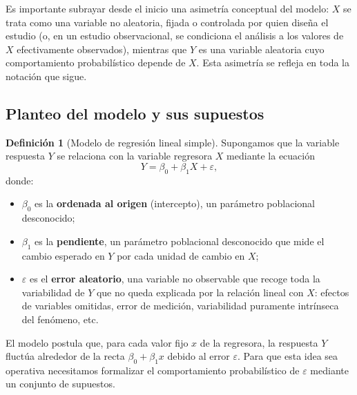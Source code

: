 \documentclass[11pt,a4paper]{article}
\theoremstyle{plain}
\theoremstyle{definition}
\newtheorem{definicion}[teorema]{Definición}
\theoremstyle{remark}
\begin{document}
Es importante subrayar desde el inicio una asimetría conceptual del modelo: $X$ se trata como una variable no aleatoria, fijada o controlada por quien diseña el estudio (o, en un estudio observacional, se condiciona el análisis a los valores de $X$ efectivamente observados), mientras que $Y$ es una variable aleatoria cuyo comportamiento probabilístico depende de $X$. Esta asimetría se refleja en toda la notación que sigue.

\subsection{Planteo del modelo y sus supuestos}

\begin{definicion}[Modelo de regresión lineal simple]
Supongamos que la variable respuesta $Y$ se relaciona con la variable regresora $X$ mediante la ecuación
\[
Y = \beta_0 + \beta_1 X + \varepsilon,
\]
donde:
\begin{itemize}
\item $\beta_0$ es la \textbf{ordenada al origen} (intercepto), un parámetro poblacional desconocido;
\item $\beta_1$ es la \textbf{pendiente}, un parámetro poblacional desconocido que mide el cambio esperado en $Y$ por cada unidad de cambio en $X$;
\item $\varepsilon$ es el \textbf{error aleatorio}, una variable no observable que recoge toda la variabilidad de $Y$ que no queda explicada por la relación lineal con $X$: efectos de variables omitidas, error de medición, variabilidad puramente intrínseca del fenómeno, etc.
\end{itemize}
\end{definicion}

El modelo postula que, para cada valor fijo $x$ de la regresora, la respuesta $Y$ fluctúa alrededor de la recta $\beta_0+\beta_1 x$ debido al error $\varepsilon$. Para que esta idea sea operativa necesitamos formalizar el comportamiento probabilístico de $\varepsilon$ mediante un conjunto de supuestos.
\end{document}
